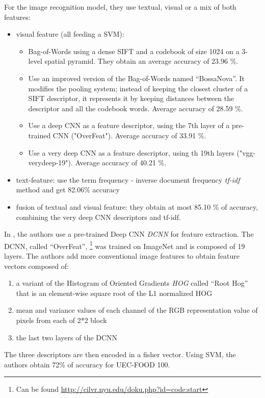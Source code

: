 For the image recognition model, they use textual, visual or a mix of both features:
\begin{itemize}
    \item visual feature (all feeding a SVM):
    \begin{itemize}
        \item Bag-of-Words using a dense SIFT and a codebook of size 1024 on a 3-level spatial pyramid. They obtain an average accuracy of 23.96 \%.
        
        \item Use an improved version of the Bag-of-Words named \enquote{BossaNova}. It modifies the pooling system; instead of keeping the closest cluster of a SIFT descriptor, it represents it by keeping distances between the descriptor and all the codebook words. Average accuracy of 28.59 \%.
        
        \item Use a deep CNN as a feature descriptor, using the 7th layer of a pre-trained CNN ("OverFeat"). Average accuracy of 33.91 \%.
        
        \item Use a very deep CNN as a feature descriptor, using th 19th layers ("vgg-verydeep-19"). Average accuracy of 40.21 \%.
    \end{itemize}
    
    \item text-feature: use the term frequency - inverse document frequency \textit{tf-idf} method and get 82.06\% accuracy
    
    \item fusion of textual and visual feature: they obtain at most 85.10 \% of accuracy, combining the very deep CNN descriptors and tf-idf.
\end{itemize}


In \cite{Kawano2014}, the authors use a pre-trained Deep CNN \textit{DCNN} for feature extraction. The DCNN, called \enquote{OverFeat}, \footnote{Can be found \url{http://cilvr.nyu.edu/doku.php?id=code:start}} was trained on ImageNet and is composed of 19 layers. The authors add more conventional image features to obtain feature vectors composed of: 
\begin{enumerate}
    \item a variant of the Histogram of Oriented Gradients \textit{HOG} called \enquote{Root Hog} that is an element-wise square root of the L1 normalized HOG
    \item mean and variance values of each channel of the RGB representation value of pixels from each of 2*2  block
    \item the last two layers of the DCNN
\end{enumerate}
The three descriptors are then encoded in a fisher vector. Using SVM, the authors obtain 72\% of  accuracy for UEC-FOOD 100.


